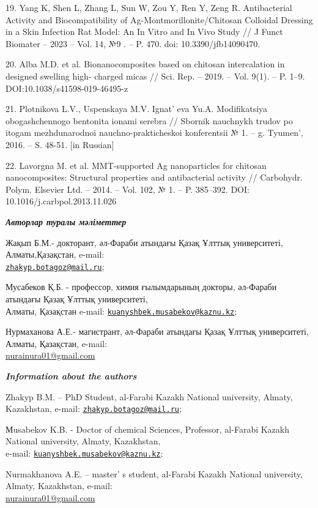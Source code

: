 \begin{references}
19. Yang K, Shen L, Zhang L, Sun W, Zou Y, Ren Y, Zeng R. Antibacterial
Activity and Biocompatibility of Ag-Montmorillonite/Chitosan Colloidal
Dressing in a Skin Infection Rat Model: An In Vitro and In Vivo Study
// J Funct Biomater -- 2023 -- Vol. 14, №9 . -- P. 470. doi:
10.3390/jfb14090470.

20. Alba M.D. et al. Bionanocomposites based on chitosan intercalation in
designed swelling high- charged micas // Sci. Rep. -- 2019. -- Vol.
9(1). -- P. 1--9. DOI:10.1038/s41598-019-46495-z

21. Plotnikova L.V., Uspenskaya M.V. Ignat' eva Yu.A.
Modifikatsiya obogashchennogo bentonita ionami serebra // Sbornik
nauchnykh trudov po itogam mezhdunarodnoi nauchno-prakticheskoi
konferentsii № 1. -- g. Tyumen', 2016. -- S. 48-51.
{[}in Russian{]}

22. Lavorgna M. et al. MMT-supported Ag nanoparticles for chitosan
nanocomposites: Structural properties and antibacterial activity //
Carbohydr. Polym. Elsevier Ltd. -- 2014. -- Vol. 102, № 1. -- P.
385--392. DOI: 10.1016/j.carbpol.2013.11.026
\end{references}

\begin{authorinfo}
\hspace{1em}\emph{{\bfseries Авторлар туралы мәліметтер}}

Жақып Б.М.- докторант, әл-Фараби атындағы Қазақ Ұлттық университеті,
Алматы,Қазақстан, e-mail:
\\\href{mailto:zhakyp.botagoz@mail.ru}{\nolinkurl{zhakyp.botagoz@mail.ru}};

Мусабеков Қ.Б. - профессор, химия ғылымдарының докторы, әл-Фараби
атындағы Қазақ Ұлттық университеті,\\ Алматы, Қазақстан e-mail:
\href{mailto:kuanyshbek.musabekov@kaznu.kz}{\nolinkurl{kuanyshbek.musabekov@kaznu.kz}};

Нурмаханова А.Е.- магистрант, әл-Фараби атындағы Қазақ Ұлттық
университеті, Алматы, Қазақстан, e-mail:
\\\href{mailto:zhakyp.botagoz@mail.ru}{nurainura01@gmail.com}

\hspace{1em}\emph{{\bfseries Information about the authors}}

Zhakyp B.M. -- PhD Student, al-Farabi Kazakh National university,
Almaty, Kazakhstan, e-mail:
\href{mailto:zhakyp.botagoz@mail.ru}{\nolinkurl{zhakyp.botagoz@mail.ru}};

Мusabekov K.B. - Doctor of chemical Sciences, Professor, al-Farabi
Kazakh National university, Almaty, Kazakhstan, \\e-mail:
\href{mailto:kuanyshbek.musabekov@kaznu.kz}{\nolinkurl{kuanyshbek.musabekov@kaznu.kz}};

Nurmakhanova A.E. -- master' s student, al-Farabi Kazakh
National university, Almaty, Kazakhstan, e-mail:
\\\href{mailto:zhakyp.botagoz@mail.ru}{nurainura01@gmail.com}
\end{authorinfo}
